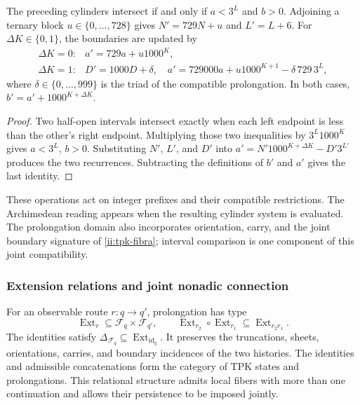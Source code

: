 \begin{lemma}
\label{ii:tpk-cilindros-enteros}
The preceding cylinders intersect if and only if
\(a<3^L\) and \(b>0\). Adjoining a ternary block
\(u\in\{0,\ldots,728\}\) gives \(N'=729N+u\) and
\(L'=L+6\). For \(\Delta K\in\{0,1\}\), the boundaries are
updated by
\[
 \begin{array}{ll}
 \Delta K=0:&a'=729a+u1000^K,\\[2pt]
 \Delta K=1:&D'=1000D+\delta,\quad
 a'=729000a+u1000^{K+1}-\delta\,729\,3^L,
 \end{array}
\]
where \(\delta\in\{0,\ldots,999\}\) is the triad of the
compatible prolongation. In both cases,
\(b'=a'+1000^{K+\Delta K}\).
\end{lemma}
\begin{proof}
Two half-open intervals intersect exactly when each left
endpoint is less than the other's right endpoint. Multiplying those two
inequalities by \(3^L1000^K\) gives \(a<3^L\), \(b>0\).
Substituting \(N'\), \(L'\), and \(D'\) into
\(a'=N'1000^{K+\Delta K}-D'3^{L'}\) produces the two recurrences.
Subtracting the definitions of \(b'\) and \(a'\) gives the last identity.
\end{proof}

These operations act on integer prefixes and their compatible
restrictions. The Archimedean reading appears when the resulting
cylinder system is evaluated. The prolongation domain also incorporates
orientation, carry, and the joint boundary signature of
\eqref{ii:tpk-fibra}; interval comparison is one component of
this joint compatibility.

\subsubsection{Extension relations and joint nonadic connection}

For an observable route \(r:q\to q'\), prolongation has type
\[
 \operatorname{Ext}_r\subseteq\mathcal F_q\times\mathcal F_{q'},
 \qquad
 \operatorname{Ext}_{r_2}\circ\operatorname{Ext}_{r_1}
 \subseteq\operatorname{Ext}_{r_2r_1}.
\]
The identities satisfy
\(\Delta_{\mathcal F_q}\subseteq
\operatorname{Ext}_{\operatorname{id}_q}\).
It preserves the truncations, sheets, orientations, carries, and
boundary incidences of the two histories. The identities and
admissible concatenations form the category of TPK states and prolongations.
This relational structure admits local fibers with more than one
continuation and allows their persistence to be imposed jointly.

